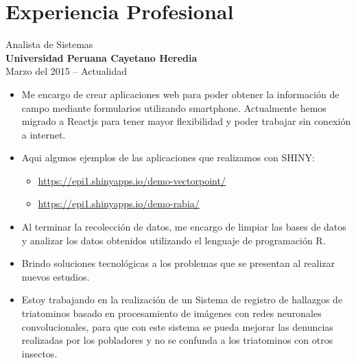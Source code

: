 \documentclass[letterpaper]{twentysecondcv} %
\begin{document}
\begin{twentyshort} %
	
	
\end{twentyshort}


\section{Experiencia Profesional}

{\Large Analista de Sistemas}\\
{\large \bf Universidad Peruana Cayetano Heredia}\\
{Marzo del 2015 -- Actualidad}
\begin{itemize}
\item Me encargo de crear aplicaciones web para poder obtener la información de campo mediante formularios utilizando smartphone. Actualmente hemos migrado a Reactjs para tener mayor flexibilidad y poder trabajar sin conexión a internet. 

\item Aqui algunos ejemplos de las aplicaciones que realizamos con SHINY:
  \begin{itemize}
	\item {\url{https://epi1.shinyapps.io/demo-vectorpoint/}}
	\item {\url{https://epi1.shinyapps.io/demo-rabia/}}\\
  \end{itemize}
\item Al terminar la recolección de datos, me encargo de limpiar las bases de datos y analizar los datos obtenidos utilizando el lenguaje de programación R.
\item Brindo soluciones tecnológicas a los problemas que se presentan al realizar nuevos estudios.
\item Estoy trabajando en la realización de un Sistema de registro de hallazgos de triatominos basado en procesamiento de imágenes con redes neuronales convolucionales, para que con este sistema se pueda mejorar las denuncias realizadas por los pobladores y no se confunda a los triatominos con otros insectos.\\
\end{itemize}
\end{document}
